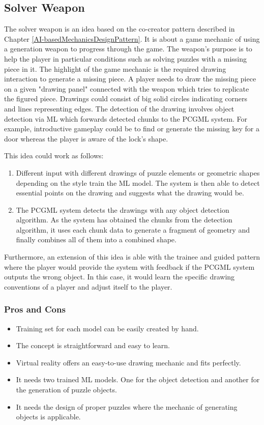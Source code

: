 \documentclass[MGS,Master,english]{twbook}%
\begin{document}
\subsection{Solver Weapon} \label{idea::solverWeapon}
The solver weapon is an idea based on the co-creator pattern described in Chapter \ref{AI-basedMechanicsDesignPattern}. It is about a game mechanic of using a generation weapon to progress through the game. The weapon's purpose is to help the player in particular conditions such as solving puzzles with a missing piece in it. The highlight of the game mechanic is the required drawing interaction to generate a missing piece. A player needs to draw the missing piece on a given "drawing panel" connected with the weapon which tries to replicate the figured piece. Drawings could consist of big solid circles indicating corners and lines representing edges. The detection of the drawing involves object detection via \ac{ML} which forwards detected chunks to the \ac{PCGML} system. For example, introductive gameplay could be to find or generate the missing key for a door whereas the player is aware of the lock's shape.

This idea could work as follows: 
\begin{enumerate}
	\item Different input with different drawings of puzzle elements or geometric shapes depending on the style train the \ac{ML} model. The system is then able to detect essential points on the drawing and suggests what the drawing would be.
	\item The \ac{PCGML} system detects the drawings with any object detection algorithm. As the system has obtained the chunks from the detection algorithm, it uses each chunk data to generate a fragment of geometry and finally combines all of them into a combined shape.
\end{enumerate}

Furthermore, an extension of this idea is able with the trainee and guided pattern where the player would provide the system with feedback if the \ac{PCGML} system outputs the wrong object. In this case, it would learn the specific drawing conventions of a player and adjust itself to the player.

\subsubsection{Pros and Cons}
\begin{itemize}
	\item Training set for each model can be easily created by hand.
	\item The concept is straightforward and easy to learn.
	\item Virtual reality offers an easy-to-use drawing mechanic and fits perfectly.
	\item It needs two trained \ac{ML} models. One for the object detection and another for the generation of puzzle objects. 
	\item It needs the design of proper puzzles where the mechanic of generating objects is applicable.
\end{itemize}
\end{document}

